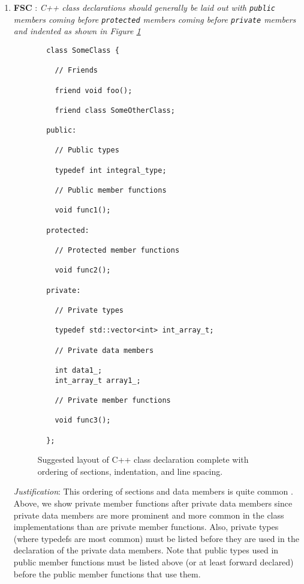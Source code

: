 \begin{enumerate}
{}\item{}\textbf{FSC }:
{}\textit{C++ class declarations should generally be laid out with
{}\texttt{public} members coming before {}\texttt{protected} members coming
before {}\texttt{private} members and indented as shown in Figure
{}\ref{fig:class_decl_layout}}

\begin{figure}
%
{\small\begin{verbatim}
  class SomeClass {

    // Friends

    friend void foo();

    friend class SomeOtherClass;

  public:

    // Public types

    typedef int integral_type;

    // Public member functions

    void func1();

  protected:

    // Protected member functions

    void func2();

  private:

    // Private types

    typedef std::vector<int> int_array_t;

    // Private data members

    int data1_;
    int_array_t array1_;

    // Private member functions

    void func3();

  };
\end{verbatim}}
%
\caption{\label{fig:class_decl_layout}
Suggested layout of C++ class declaration complete with ordering of sections,
indentation, and line spacing.}
%
\end{figure}


{}\textit{Justification}: This ordering of sections and data members is quite
common {}\cite[Section 31.8]{CodeComplete2nd04}.  Above, we show private
member functions after private data members since private data members are
more prominent and more common in the class implementations than are private
member functions.  Also, private types (where typedefs are most common) must
be listed before they are used in the declaration of the private data members.
Note that public types used in public member functions must be listed above
(or at least forward declared) before the public member functions that use
them.


\end{enumerate}
